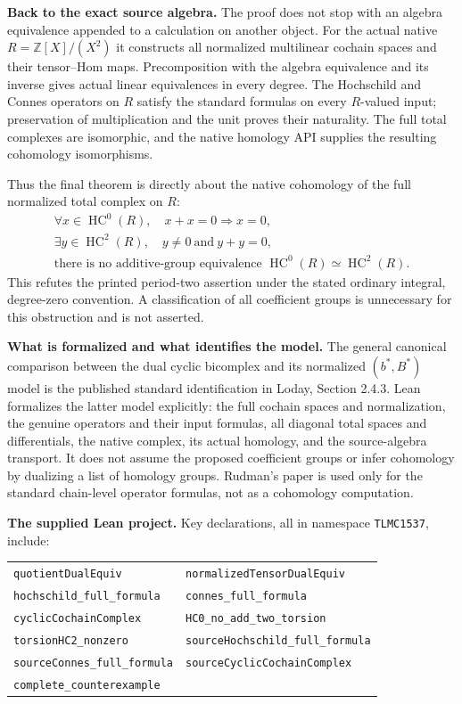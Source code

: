 \documentclass[10pt,a4paper]{article}
\newcommand{\Z}{\mathbb Z}
\newcommand{\HC}{\operatorname{HC}}
\begin{document}
\newpage
\textbf{Back to the exact source algebra.}
The proof does not stop with an algebra equivalence appended to a calculation
on another object. For the actual native $R=\Z[X]/(X^2)$ it constructs all
normalized multilinear cochain spaces and their tensor--Hom maps.
Precomposition with the algebra equivalence and its inverse gives actual
linear equivalences in every degree. The Hochschild and Connes operators
on $R$ satisfy the standard formulas on every $R$-valued input; preservation
of multiplication and the unit proves their naturality.
The full total complexes are isomorphic, and the native homology API supplies
the resulting cohomology isomorphisms.

Thus the final theorem is directly about the native cohomology of the full
normalized total complex on $R$:
\[
 \begin{gathered}
 \forall x\in\HC^0(R),\quad x+x=0\Longrightarrow x=0,\\
 \exists y\in\HC^2(R),\quad y\ne0\ \text{and}\ y+y=0,\\
 \text{there is no additive-group equivalence }\HC^0(R)\simeq\HC^2(R).
 \end{gathered}
\]
This refutes the printed period-two assertion under the stated ordinary
integral, degree-zero convention. A classification of all coefficient
groups is unnecessary for this obstruction and is not asserted.

\textbf{What is formalized and what identifies the model.}
The general canonical comparison between the dual cyclic bicomplex and its
normalized $(b^*,B^*)$ model is the published standard identification in
Loday, Section 2.4.3. Lean formalizes the latter model explicitly: the full
cochain spaces and normalization, the genuine operators and their input
formulas, all diagonal total spaces and differentials, the native complex,
its actual homology, and the source-algebra transport. It does not assume
the proposed coefficient groups or infer cohomology by dualizing a list of
homology groups. Rudman's paper is used only for the standard chain-level
operator formulas, not as a cohomology computation.

\textbf{The supplied Lean project.}
Key declarations, all in namespace \texttt{TLMC1537}, include:

\begin{tabular}{@{}ll@{}}
\texttt{quotientDualEquiv} & \texttt{normalizedTensorDualEquiv}\\
\texttt{hochschild\_full\_formula} & \texttt{connes\_full\_formula}\\
\texttt{cyclicCochainComplex} & \texttt{HC0\_no\_add\_two\_torsion}\\
\texttt{torsionHC2\_nonzero} & \texttt{sourceHochschild\_full\_formula}\\
\texttt{sourceConnes\_full\_formula} & \texttt{sourceCyclicCochainComplex}\\
\texttt{complete\_counterexample} &
\end{tabular}
\end{document}
